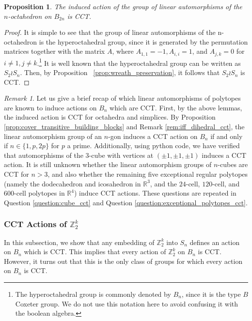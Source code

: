 \documentclass[smallextended, envcountsame, numbook]{svjour3}
\theoremstyle{plain}
\newtheorem{prop}[thm]{Proposition}
\theoremstyle{definition}
\theoremstyle{remark}
\newtheorem{rmk}[thm]{Remark}
\numberwithin{equation}{section}
\newcommand\sssec{\subsubsection}
\begin{document}
\begin{prop}
The induced action of the group of linear automorphisms of the $n$-octahedron on $B_{2n}$ is CCT.
\end{prop}
\begin{proof}
It is simple to see that the group of linear automorphisms of the n-octahedron is the hyperoctahedral group, since it is generated by the permutation matrices together with the matrix $A$, where $A_{1,1} = -1,A_{i,i} = 1$, and $A_{j,k} = 0$ for $i \neq 1, j \neq k$.\footnote{The hyperoctahedral group is commonly denoted by $B_n$, since it is the type $B$ Coxeter group. We do not use this notation here to avoid confusing it with the boolean algebra.} It is well known that the hyperoctahedral group can be written as $S_2 \wr S_n$. Then, by Proposition ~\ref{prop:wreath_preservation}, it follows that $S_2 \wr S_n$ is CCT.
\end{proof}

\begin{rmk}
Let us give a brief recap of which linear automorphisms of polytopes are known to induce actions on $B_n$ which are CCT. First, by the above lemmas, the induced action is CCT for octahedra and simplices. By Proposition  \ref{prop:cover_transitive_building_blocks} and Remark \ref{rem:iff_dihedral_cct}, the linear automorphism group of an $n$-gon induces a CCT action on $B_n$ if and only if $n\in \{1,p,2p\}$ for $p$ a prime. Additionally, using python code, we have verified that automorphisms of the 3-cube with vertices at $(\pm 1,\pm 1,\pm 1)$ induces a CCT action. It is still unknown whether the linear automorphism groups of $n$-cubes are CCT for $n> 3$, and also whether the remaining five exceptional regular polytopes (namely the dodecahedron and icosahedron in $\mathbb R^3$, and the $24$-cell, $120$-cell, and $600$-cell polytopes in $\mathbb R^4$) induce CCT actions. These questions are repeated in Question \ref{question:cube_cct} and Question \ref{question:exceptional_polytopes_cct}.

\end{rmk}

\sssec{CCT Actions of $\mathbb Z_2^k$}

In this subsection, we show that any embedding of $\mathbb Z_2^k$ into $S_n$ defines an action on $B_n$ which is CCT.  This implies that every action of $\mathbb Z_2^k$ on $B_n$ is CCT. However, it turns out that this is the only class of groups for which every action on $B_n$ is CCT.
\end{document}
